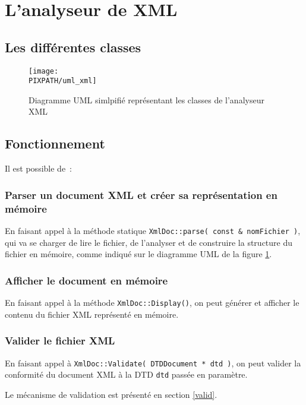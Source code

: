 \section{L'analyseur de XML}

    \subsection{Les différentes classes}
    
    \begin{center}
    \begin{figure}[h]
        \texttt{[image: \\PIXPATH/uml\_xml]}
        \caption{Diagramme UML simlpifié représentant les classes
                                                    de l'analyseur XML}
        \label{umlxml}
    \end{figure}
    \end{center}

    \subsection{Fonctionnement}

    Il est possible de~:

        \subsubsection{Parser un document XML et créer sa représentation 
                                                                en mémoire}

        En faisant appel à la méthode statique
        {\tt XmlDoc::parse( const \& nomFichier )},
        qui va se charger de lire le fichier, de l'analyser et de construire la
        structure du fichier en mémoire, comme indiqué sur le diagramme UML de
        la figure \ref{umlxml}. 

        \subsubsection{Afficher le document en mémoire}

        En faisant appel à la méthode {\tt XmlDoc::Display()}, on peut générer
        et afficher le contenu du fichier XML représenté en mémoire.

        \subsubsection{Valider le fichier XML}

        En faisant appel à {\tt XmlDoc::Validate( DTDDocument * dtd )}, on peut
        valider la conformité du document XML à la DTD {\tt dtd} passée en
        paramètre.

        Le mécanisme de validation est présenté en section \ref{valid}.
